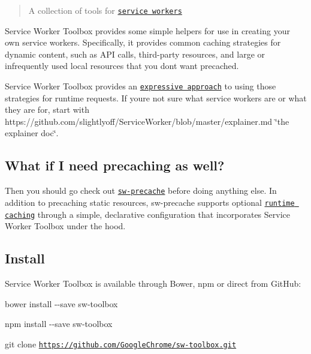 \href{https://travis-ci.org/GoogleChrome/sw-toolbox}{\tt } \href{https://david-dm.org/googlechrome/sw-toolbox}{\tt } \href{https://david-dm.org/googlechrome/sw-toolbox?type=dev}{\tt }

\begin{quote}
A collection of tools for \href{https://w3c.github.io/ServiceWorker/}{\tt service workers} \end{quote}


Service Worker Toolbox provides some simple helpers for use in creating your own service workers. Specifically, it provides common caching strategies for dynamic content, such as A\+PI calls, third-\/party resources, and large or infrequently used local resources that you don\textquotesingle{}t want precached.

Service Worker Toolbox provides an \href{https://googlechrome.github.io/sw-toolbox/usage.html#express-style-routes}{\tt expressive approach} to using those strategies for runtime requests. If you\textquotesingle{}re not sure what service workers are or what they are for, start with https\+://github.com/slightlyoff/\+Service\+Worker/blob/master/explainer.\+md \char`\"{}the explainer doc\char`\"{}.

\subsection*{What if I need precaching as well?}

Then you should go check out \href{https://github.com/GoogleChrome/sw-precache}{\tt {\ttfamily sw-\/precache}} before doing anything else. In addition to precaching static resources, {\ttfamily sw-\/precache} supports optional \href{https://github.com/GoogleChrome/sw-precache#runtime-caching}{\tt runtime caching} through a simple, declarative configuration that incorporates Service Worker Toolbox under the hood.

\subsection*{Install}

Service Worker Toolbox is available through Bower, npm or direct from Git\+Hub\+:

{\ttfamily bower install -\/-\/save sw-\/toolbox}

{\ttfamily npm install -\/-\/save sw-\/toolbox}

{\ttfamily git clone \href{https://github.com/GoogleChrome/sw-toolbox.git}{\tt https\+://github.\+com/\+Google\+Chrome/sw-\/toolbox.\+git}}

